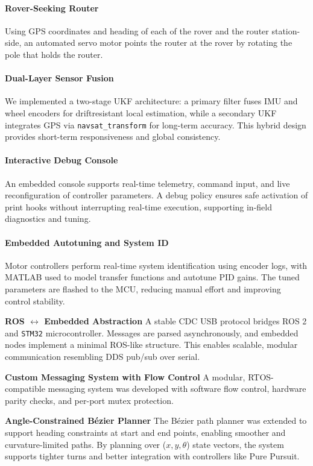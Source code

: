 \documentclass[12pt,a4paper,twocolumn]{article}
\begin{document}
\paragraph{Rover-Seeking Router}
Using GPS coordinates and heading of each of the rover and the router station-side, an automated servo motor points the router at the rover by rotating the pole that holds the router.

\paragraph{Dual-Layer Sensor Fusion}
We implemented a two-stage UKF architecture: a primary filter fuses IMU and wheel encoders for driftresistant local estimation, while a secondary UKF integrates GPS via \texttt{navsat\_transform} for long-term accuracy.
This hybrid design provides short-term responsiveness and global consistency.

\paragraph{Interactive Debug Console}
An embedded console supports real-time telemetry, command input, and live reconfiguration of controller parameters.
A debug policy ensures safe activation of print hooks without interrupting real-time execution, supporting in-field diagnostics and tuning.

\paragraph{Embedded Autotuning and System ID}
Motor controllers perform real-time system identification using encoder logs, with MATLAB used to model transfer functions and autotune PID gains.
The tuned parameters are flashed to the MCU, reducing manual effort and improving control stability.

\textbf{ROS $ \leftrightarrow $ Embedded Abstraction}
A stable CDC USB protocol bridges ROS 2 and \texttt{STM32} microcontroller.
Messages are parsed asynchronously, and embedded nodes implement a minimal ROS-like structure.
This enables scalable, modular communication resembling DDS pub/sub over serial.

\textbf{Custom Messaging System with Flow Control}
A modular, RTOS-compatible messaging system was developed with software flow control, hardware parity checks, and per-port mutex protection.

\textbf{Angle-Constrained B\'ezier Planner}
The B\'ezier path planner was extended to support heading constraints at start and end points, enabling smoother and curvature-limited paths. By planning over ($x,y,\theta$) state vectors, the system supports tighter turns and better integration with controllers like Pure Pursuit.
\end{document}
